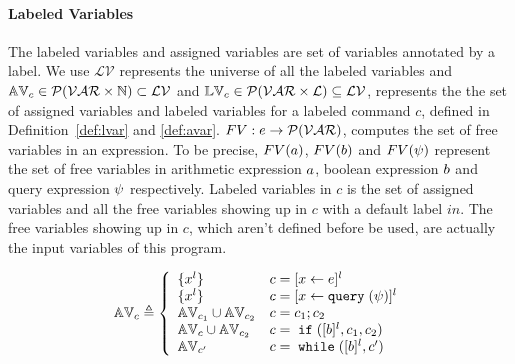 \paragraph*{Labeled Variables}
The labeled variables and assigned variables are set of variables annotated by a label. 
We use  
$\mathcal{LV}$ represents the universe of all the labeled variables and 
$\mathbb{AV}_c \in \mathcal{P}(\mathcal{VAR} \times \mathbb{N}) \subset \mathcal{LV}$ and 
$\mathbb{LV}_c \in \mathcal{P}(\mathcal{VAR} \times \mathcal{L}) \subseteq \mathcal{LV}$,
represents the the set of assigned variables and labeled variables for a labeled command $c$,
defined in Definition~\ref{def:lvar} and \ref{def:avar}.
%
$FV: e \to \mathcal{P}(\mathcal{VAR})$, computes the set of free variables in an expression. To be precise,
$FV(a)$, $FV(b)$ and $FV(\psi)$ represent the set of free variables in arithmetic
expression $a$, boolean expression $b$ and query expression $\psi$ respectively.
Labeled variables in $c$ is the set of assigned variables and all the free variables
showing up in $c$ with a default label $in$. 
The free variables
showing up in $c$, which aren't defined before be used, are actually the input variables of this program.
%
%
\begin{defn}
\label{def:avar}
$$ \avar_{c} \triangleq
  \left\{
  \begin{array}{ll}
      \{{x}^l\}                   
      & {c} = [{\assign x e}]^{l} 
      \\
      \{{x}^l\}                   
      & {c} = [{\assign x \query(\qexpr)}]^{l} 
      \\
      \avar_{{c_1}} \cup \avar_{{c_2}}  
      & {c} = {c_1};{c_2}
      \\
      \avar_{{c}} \cup \avar_{{c_2}} 
      & {c} =\eif([\bexpr]^{l}, c_1, c_2) 
      \\
      \avar_{{c}'}
      & {c}   = \ewhile ([\bexpr]^{l}, {c}')
\end{array}
\right.
$$
\end{defn}
%
%
